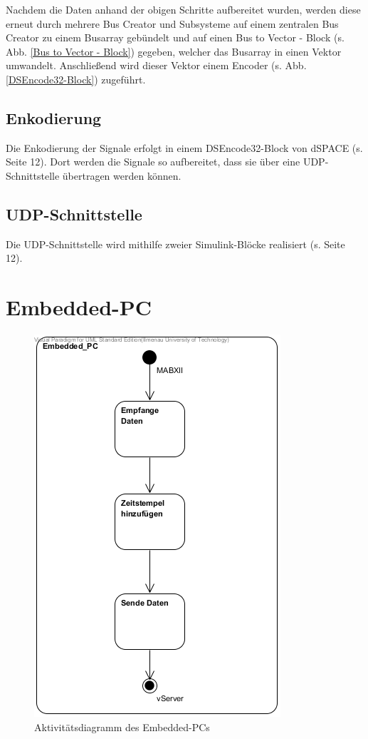 \documentclass[fontsize = 12pt, paper = a4]{scrreprt}
\begin{document}
Nachdem die Daten anhand der obigen Schritte aufbereitet wurden, werden diese erneut durch mehrere Bus Creator und Subsysteme auf einem zentralen Bus Creator zu einem Busarray gebündelt und auf einen Bus to Vector - Block (s. Abb. \ref{Bus to Vector - Block}) gegeben, welcher das Busarray in einen Vektor umwandelt. Anschließend wird dieser Vektor einem Encoder (s. Abb. \ref{DSEncode32-Block}) zugeführt.

\subsection{Enkodierung}

Die Enkodierung der Signale erfolgt in einem DSEncode32-Block von dSPACE (s. Seite 12). Dort werden die Signale so aufbereitet, dass sie über eine UDP-Schnittstelle übertragen werden können. 

\subsection{UDP-Schnittstelle} 

Die UDP-Schnittstelle wird mithilfe zweier Simulink-Blöcke realisiert (s. Seite 12). 

\section{Embedded-PC}

\begin{figure}[h]
\centering
\includegraphics[scale = 0.70]{activity_embedded_pc.png}
\caption[Aktivitätsdiagramm Embedded-PC]{Aktivitätsdiagramm des Embedded-PCs}
\end{figure} 
\end{document}
